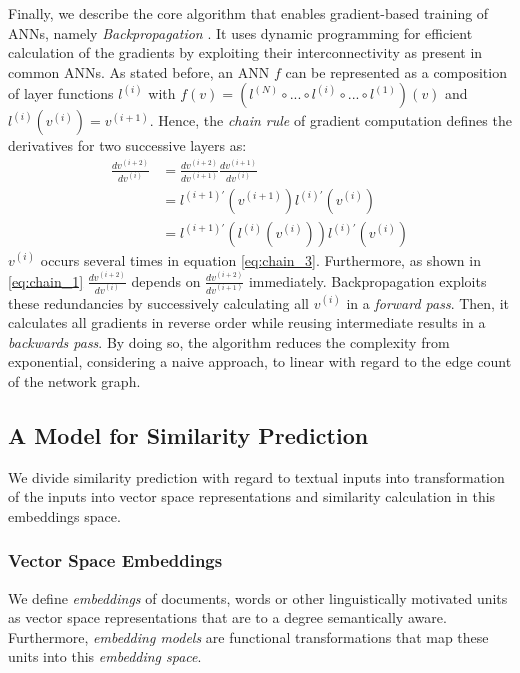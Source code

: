 Finally, we describe the core algorithm that enables gradient-based training of \ac{ANN}s, namely \textit{Backpropagation} \autocite{rumelhart_learning_1988}. It uses dynamic programming for efficient calculation of the gradients by exploiting their interconnectivity as present in common \ac{ANN}s. As stated before, an \ac{ANN} $f$ can be represented as a composition of layer functions $l^{(i)}$ with $f(v) = (l^{(N)} \circ ... \circ l^{(i)} \circ ... \circ l^{(1)})(v)$ and $l^{(i)}(v^{(i)}) = v^{(i+1)}$. Hence, the \textit{chain rule} of gradient computation defines the derivatives for two successive layers as:  
\begin{align}
  \frac{dv^{(i+2)}}{dv^{(i)}} & = \frac{dv^{(i+2)}}{dv^{(i+1)}}\frac{dv^{(i+1)}}{dv^{(i)}} \label{eq:chain_1}\\
    & = l^{(i+1)'}(v^{(i+1)})l^{(i)'}(v^{(i)}) \label{eq:chain_2}\\
    & = l^{(i+1)'}(l^{(i)}(v^{(i)}))l^{(i)'}(v^{(i)})  \label{eq:chain_3}
\end{align}
$v^{(i)}$ occurs several times in equation \eqref{eq:chain_3}. Furthermore, as shown in \eqref{eq:chain_1} $\frac{dv^{(i+2)}}{dv^{(i)}}$ depends on $\frac{dv^{(i+2)}}{dv^{(i+1)}}$ immediately. Backpropagation exploits these redundancies by successively calculating all $v^{(i)}$ in a \textit{forward pass}. Then, it calculates all gradients in reverse order while reusing intermediate results in a \textit{backwards pass}. By doing so, the algorithm reduces the complexity from exponential, considering a naive approach, to linear with regard to the edge count of the network graph.

\subsection{A Model for Similarity Prediction}
We divide similarity prediction with regard to textual inputs into transformation of the inputs into vector space representations and 
similarity calculation in this embeddings space.

\subsubsection{Vector Space Embeddings}
We define \textit{embeddings} of documents, words or other linguistically motivated units as vector space representations that are to a degree semantically aware. Furthermore, \textit{embedding models} are functional transformations that map these units into this \textit{embedding space}. 

